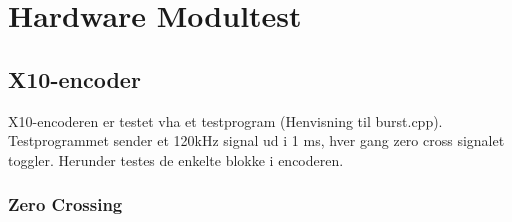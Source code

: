 \section{Hardware Modultest}

\subsection{X10-encoder}
X10-encoderen er testet vha et testprogram (Henvisning til burst.cpp). Testprogrammet sender et 120kHz signal ud i 1 ms, hver gang zero cross signalet toggler. Herunder testes de enkelte blokke i encoderen.    

\subsubsection{Zero Crossing}

